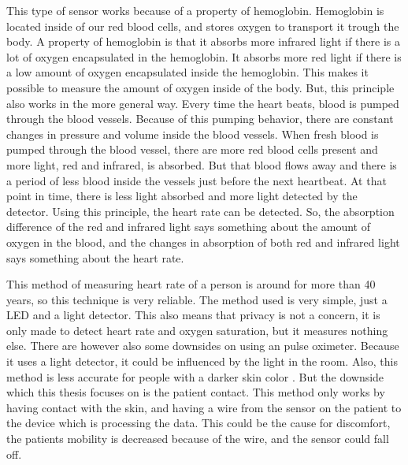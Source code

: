 This type of sensor works because of a property of hemoglobin. Hemoglobin is located inside of our red blood cells, and stores oxygen to transport it trough the body. A property of hemoglobin is that it absorbs more infrared light if there is a lot of oxygen encapsulated in the hemoglobin. It absorbs more red light if there is a low amount of oxygen encapsulated inside the hemoglobin. This makes it possible to measure the amount of oxygen inside of the body. But, this principle also works in the more general way. Every time the heart beats, blood is pumped through the blood vessels. Because of this pumping behavior, there are constant changes in pressure and volume inside the blood vessels. When fresh blood is pumped through the blood vessel, there are more red blood cells present and more light, red and infrared, is absorbed. But that blood flows away and there is a period of less blood inside the vessels just before the next heartbeat. At that point in time, there is less light absorbed and more light detected by the detector. Using this principle, the heart rate can be detected. So, the absorption difference of the red and infrared light says something about the amount of oxygen in the blood, and the changes in absorption of both red and infrared light says something about the heart rate.

This method of measuring heart rate of a person is around for more than 40 years, so this technique is very reliable. The method used is very simple, just a LED and a light detector. This also means that privacy is not a concern, it is only made to detect heart rate and oxygen saturation, but it measures nothing else. There are however also some downsides on using an pulse oximeter. Because it uses a light detector, it could be influenced by the light in the room. Also, this method is less accurate for people with a darker skin color \cite{feiner2007dark}. But the downside which this thesis focuses on is the patient contact. This method only works by having contact with the skin, and having a wire from the sensor on the patient to the device which is processing the data. This could be the cause for discomfort, the patients mobility is decreased because of the wire, and the sensor could fall off. 


